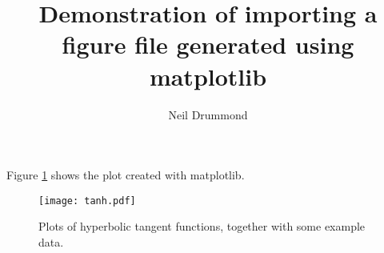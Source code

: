 \documentclass[a4,10pt]{article}
\begin{document}
\title{Demonstration of importing a figure file generated using matplotlib}

\author{Neil Drummond}

\maketitle

\lipsum[1] Figure \ref{fig:example} shows the plot created with matplotlib.

\begin{figure}[!htbp]
\centering
\texttt{[image: tanh.pdf]}
\caption{Plots of hyperbolic tangent functions, together with some
  example data. \label{fig:example}}
\end{figure}

\lipsum[1]
\end{document}
